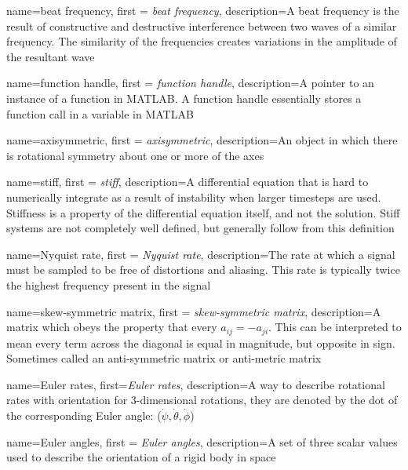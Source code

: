 {
    name=beat frequency,
    first = {\textit{beat frequency}},
    description={A beat frequency is the result of constructive and destructive interference between two waves of a similar frequency. The similarity of the frequencies creates variations in the amplitude of the resultant wave}
}

{
    name=function handle,
    first = {\textit{function handle}},
    description={A pointer to an instance of a function in MATLAB. A function handle essentially stores a function call in a variable in MATLAB}
}

{
    name=axisymmetric,
    first = {\textit{axisymmetric}},
    description={An object in which there is rotational symmetry about one or more of the axes}
}

{
    name=stiff,
    first = {\textit{stiff}},
    description={A differential equation that is hard to numerically integrate as a result of instability when larger timesteps are used. Stiffness is a property of the differential equation itself, and not the solution. Stiff systems are not completely well defined, but generally follow from this definition}
}

{
    name=Nyquist rate,
    first = {\textit{Nyquist rate}},
    description={The rate at which a signal must be sampled to be free of distortions and aliasing. This rate is typically twice the highest frequency present in the signal}
}

{
    name=skew-symmetric matrix,
    first = {\textit{skew-symmetric matrix}},
    description={A matrix which obeys the property that every $a_{ij}=-a_{ji}$. This can be interpreted to mean every term across the diagonal is equal in magnitude, but opposite in sign. Sometimes called an anti-symmetric matrix or anti-metric matrix}
}

{
    name=Euler rates,
    first={\textit{Euler rates}},
    description={A way to describe rotational rates with orientation for 3-dimensional rotations, they are denoted by the dot of the corresponding Euler angle: ($\dot{\psi},\dot{\theta},\dot{\phi}$)}
}

{
    name=Euler angles,
    first = {\textit{Euler angles}},
    description={A set of three scalar values used to describe the orientation of a rigid body in space}
}

